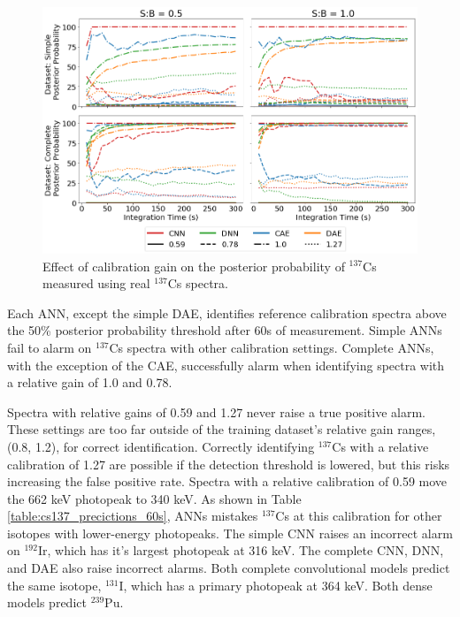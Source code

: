 \begin{figure}[H]
	\centering
	\includegraphics[width=1.0\linewidth]{images/realspectra-cal-cs137}
	\caption{Effect of calibration gain on the posterior probability of $^{137}$Cs measured using real $^{137}$Cs spectra.}
	\label{fig:realspectra-cal-cs137}
\end{figure}

Each ANN, except the simple DAE, identifies reference calibration spectra above the 50\% posterior probability threshold after 60s of measurement. Simple ANNs fail to alarm on $^{137}$Cs spectra with other calibration settings. Complete ANNs, with the exception of the CAE, successfully alarm when identifying spectra with a relative gain of 1.0 and 0.78.

Spectra with relative gains of 0.59 and 1.27 never raise a true positive alarm. These settings are too far outside of the training dataset's relative gain ranges, (0.8, 1.2), for correct identification. Correctly identifying $^{137}$Cs with a relative calibration of 1.27 are possible if the detection threshold is lowered, but this risks increasing the false positive rate. Spectra with a relative calibration of 0.59 move the 662 keV photopeak to 340 keV. As shown in Table \ref{table:cs137_precictions_60s}, ANNs mistakes $^{137}$Cs at this calibration for other isotopes with lower-energy photopeaks. The simple CNN raises an incorrect alarm on $^{192}$Ir, which has it's largest photopeak at 316 keV. The complete CNN, DNN, and DAE also raise incorrect alarms. Both complete convolutional models predict the same isotope, $^{131}$I, which has a primary photopeak at 364 keV. Both dense models predict $^{239}$Pu.

